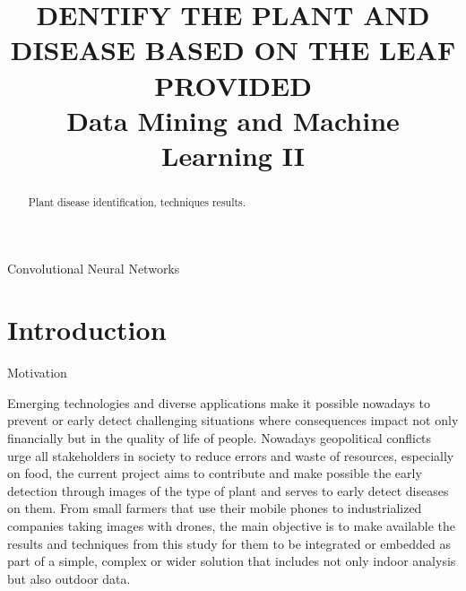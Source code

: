 \documentclass[conference]{IEEEtran}
\begin{document}
\title{DENTIFY THE PLANT AND DISEASE BASED ON THE LEAF PROVIDED\\
{\footnotesize Data Mining and Machine Learning II}
}

\author{
\and
{}
\and
{}
\and
{}
}

\maketitle

\begin{abstract}
Plant disease identification, techniques results.
\end{abstract}

\begin{IEEEkeywords}
Convolutional Neural Networks 
\end{IEEEkeywords}

\section{Introduction}
Motivation 

Emerging technologies and diverse applications make it possible nowadays to prevent or early detect challenging situations where consequences impact not only financially but in the quality of life of people. Nowadays geopolitical conflicts urge all stakeholders in society to reduce errors and waste of resources, especially on food, the current project aims to contribute and make possible the early detection through images of the type of plant and serves to early detect diseases on them. From small farmers that use their mobile phones to industrialized companies taking images with drones, the main objective is to make available the results and techniques from this study for them to be integrated or embedded as part of a simple, complex or wider solution that includes not only indoor analysis but also outdoor data. 
\end{document}
